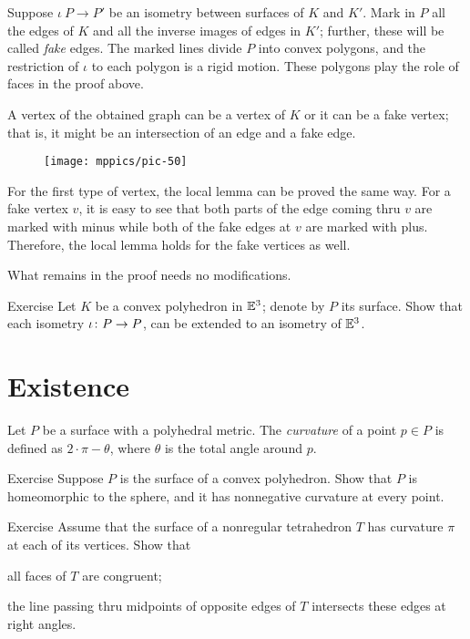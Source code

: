Suppose $\iota\:P\to P'$ be an isometry between surfaces of $K$ and $K'$.
Mark in $P$ all the edges of $K$ and all the inverse images of edges in $K'$; further, these will be called \emph{fake} edges.
The marked lines divide $P$ into convex polygons, and the restriction of $\iota$ to each polygon is a rigid motion.
These polygons play the role of faces in the proof above.

A vertex of the obtained graph can be a vertex of $K$ or it can be a fake vertex;
that is, it might be an intersection of an edge and a fake edge.

\begin{figure}[ht!]
\vskip-0mm
\centering
\texttt{[image: mppics/pic-50]}
\vskip-0mm
\end{figure}

For the first type of vertex, the local lemma can be proved the same way. 
For a fake vertex $v$, it is easy to see that both parts of the edge coming thru $v$ are marked with minus
while both of the fake edges at $v$ are marked with plus.
Therefore, the local lemma holds for the fake vertices as well.

What remains in the proof needs no modifications.
\qeds

\begin{thm}{Exercise}\label{pr:K-P-simmetry}
Let $K$ be a convex polyhedron in $\mathbb{E}^3$;
denote by $P$ its surface.
Show that each isometry $\iota\:P\z\to P$,
can be extended to an isometry of $\mathbb{E}^3$. 
\end{thm}

\section{Existence}\label{sec:Alexandrov-existence}

Let $P$ be a surface with a polyhedral metric.
The \emph{curvature} of a point $p\in P$ is defined as $2\cdot \pi -\theta$,
where $\theta$ is the total angle around $p$.

\begin{thm}{Exercise}\label{ex:sphere-with-pos}
Suppose $P$ is the surface of a convex polyhedron.
Show that $P$ is homeomorphic to the sphere, and it has nonnegative curvature at every point.
\end{thm}

\begin{thm}{Exercise}\label{pr:tetrahedron} 
Assume that the surface of a nonregular tetrahedron $T$ has curvature $\pi$ at each of its vertices.
Show that 

\begin{subthm}{}
all faces of $T$ are congruent; 
\end{subthm}

\begin{subthm}{} the line passing thru midpoints of opposite edges of $T$ intersects these edges at right angles.
\end{subthm}
 
\end{thm}


